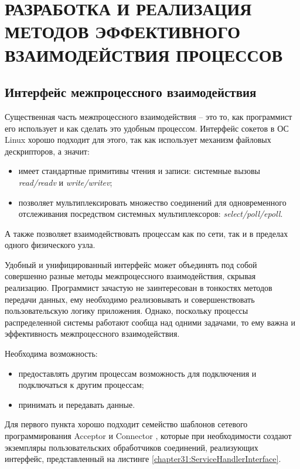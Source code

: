 \chapter{РАЗРАБОТКА И РЕАЛИЗАЦИЯ МЕТОДОВ ЭФФЕКТИВНОГО ВЗАИМОДЕЙСТВИЯ ПРОЦЕССОВ}\label{chapter31}

\section{Интерфейс межпроцессного взаимодействия}\label{chapter31:SecInterface}

Существенная часть межпроцессного взаимодействия -- это то, как программист его использует и как сделать это удобным процессом. Интерфейс сокетов в ОС Linux хорошо подходит для этого, так как использует механизм файловых дескрипторов, а значит:
\begin{itemize}
\item имеет стандартные примитивы чтения и записи: системные вызовы \textit{read/readv} и \textit{write/writev};
\item позволяет мультиплексировать множество соединений для одновременного отслеживания посредством системных мультиплексоров: \textit{select/poll/epoll}.
\end{itemize}

А также позволяет взаимодействовать процессам как по сети, так и в пределах одного физического узла.

Удобный и унифицированный интерфейс может объединять под собой совершенно разные методы межпроцессного взаимодействия, скрывая реализацию. Программист зачастую не заинтересован в тонкостях методов передачи данных, ему необходимо реализовывать и совершенствовать пользовательскую логику приложения. Однако, поскольку процессы распределенной системы работают сообща над одними задачами, то ему важна и эффективность межпроцессного взаимодействия.

Необходима возможность:
\begin{itemize}
\item предоставлять другим процессам возможность для подключения и подключаться к другим процессам;
\item принимать и передавать данные.
\end{itemize}

Для первого пункта хорошо подходит семейство шаблонов сетевого программирования Acceptor и Connector \cite{schmidt1996acceptor}, которые при необходимости создают экземпляры пользовательских обработчиков соединений, реализующих интерфейс, представленный на листинге \ref{chapter31:ServiceHandlerInterface}.

